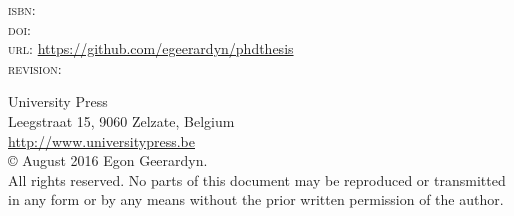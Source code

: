 \thispagestyle{empty}
\begin{bottompar}

\textsc{isbn:} \\
\textsc{doi:} \\
\textsc{url:} \url{https://github.com/egeerardyn/phdthesis}\\
\textsc{revision:} \texttt{\VCRevision}

University Press\\
Leegstraat 15, 9060 Zelzate, Belgium\\
\url{http://www.universitypress.be}\\

\copyright{} August 2016 Egon Geerardyn.\\

All rights reserved. No parts of this document may be reproduced or transmitted in any form or by any means without the prior written permission of the author.






\end{bottompar}
